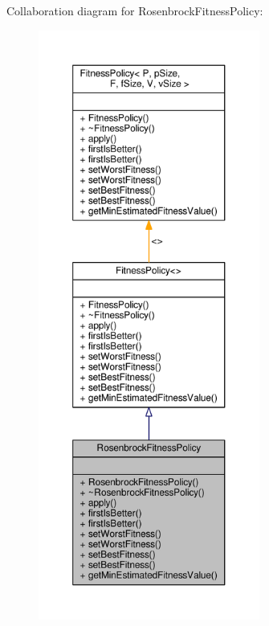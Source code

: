 Collaboration diagram for Rosenbrock\+Fitness\+Policy\+:
\nopagebreak
\begin{figure}[H]
\begin{center}
\leavevmode
\includegraphics[height=550pt]{classRosenbrockFitnessPolicy__coll__graph}
\end{center}
\end{figure}
